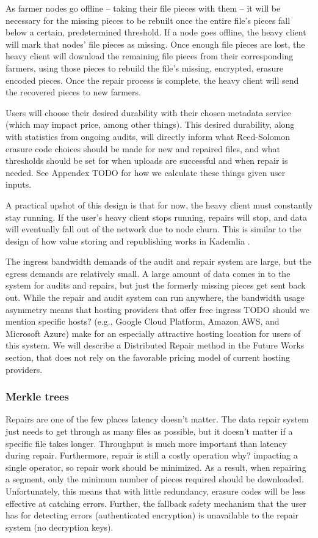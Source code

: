 \documentclass[a4paper,10pt]{article} \usepackage[utf8]{inputenc}
\newcommand{\todo}[1]{{\color{red} TODO #1 }}
\newcommand{\bs}[1]{{\color{red}#1}}
\begin{document}
As farmer nodes go offline -- taking their file pieces with them -- 
it will be 
necessary for the missing pieces to be rebuilt once the entire file's pieces
fall below a certain, predetermined threshold. If a node goes offline, the
heavy client will mark that nodes' file pieces as missing. 
Once enough file pieces are lost, the heavy client will download the
remaining file pieces from their corresponding farmers, using those pieces 
to rebuild the file's missing, encrypted, erasure encoded pieces.
Once the repair process is complete, the heavy client will send the
recovered pieces to new farmers.

Users will choose their desired durability with their chosen metadata service
(which may impact price, among other things). This desired durability, along 
with
statistics from ongoing audits, will directly inform what Reed-Solomon erasure
code choices should be made for new and repaired files, and what thresholds
should be set for when uploads are successful and when repair is needed. See
Appendex \todo{} for how we calculate these things given user inputs.

A practical upshot of this design is that for now, the heavy client must
constantly stay running. If the user's heavy client stops running, repairs will
stop, and data will eventually fall out of the network due to node churn. This
is similar to the design of how value storing and republishing works in
Kademlia \cite{kad}.

The ingress bandwidth demands of the audit and repair system are large, but the
egress demands are relatively small. A large amount of data comes in to the
system for audits and repairs, but just the formerly missing pieces get sent
back out.
While the repair and audit system can run anywhere, the bandwidth usage
asymmetry means that hosting providers
that offer free ingress \todo{should we mention specific hosts?
(e.g., Google Cloud Platform, Amazon AWS, and Microsoft Azure)}
make for an especially attractive hosting location for users of this system. We will describe a Distributed Repair method in the Future Works section, that does not rely on the favorable pricing model of current hosting providers. 

\subsubsection{Merkle trees}

Repairs are one of the few places latency doesn't matter. The data repair system
just needs to get through as many files as possible, but it doesn't matter if
a specific file takes longer. Throughput is much more important than
latency during repair. Furthermore, repair
is still a costly operation \bs{why?} impacting a single operator, so 
repair work should be minimized. 
As a result, when repairing a segment, 
only the minimum number of pieces required should be downloaded. 
Unfortunately, this means that
with little redundancy, erasure codes will be less effective at catching errors.
Further, the fallback safety mechanism that the user has for detecting errors
(authenticated encryption) is unavailable to the repair system (no decryption
keys).
\end{document}

